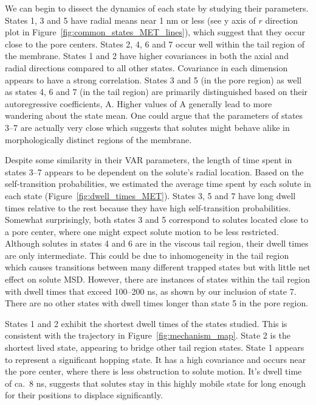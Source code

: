 \documentclass[journal=jpcbfk,manuscript=article]{achemso}
\begin{document}
  We can begin to dissect the dynamics of each state by studying their parameters.
  States 1, 3 and 5 have radial means near 1 nm or less (see y axis of $r$ direction 
  plot in Figure~\ref{fig:common_states_MET_lines}), which suggest that they occur
  close to the pore centers. States 2, 4, 6 and 7 occur well within the tail region
  of the membrane. States 1 and 2 have higher covariances in both the axial and radial
  directions compared to all other states. Covariance in each dimension appears to have
  a strong correlation. States 3 and 5 (in the pore region) as well as states 4, 6 and
  7 (in the tail region) are primarily distinguished based on their autoregressive 
  coefficients, A. Higher values of A generally lead to more wandering about the state
  mean. One could argue that the parameters of states 3--7 are actually very close which
  suggests that solutes might behave alike in 
  morphologically
  distinct regions of the 
  membrane.

  Despite some similarity in their VAR parameters, the length of time spent in states 
  3--7 appears to be dependent on the solute's radial location. Based on the 
  self-transition probabilities, we estimated the average time spent by each solute in
  each state (Figure~\ref{fig:dwell_times_MET}). States 3, 5 and 7 have long dwell times
  relative to the rest because they have high self-transition probabilities. Somewhat 
  surprisingly, both states 3 and 5 correspond to solutes located close to a pore center,
  where one might expect solute motion to be less restricted. 
  Although solutes in states
  4 and 6 are in the viscous tail region, their dwell times are only intermediate. This
  could be due to inhomogeneity in the tail region which causes transitions between many
  different trapped states but with little net effect on solute MSD. However, there are
  instances of states within the tail region with dwell times that exceed 100--200 ns,
  as shown by our inclusion of state 7. There are no other states with dwell times longer
  than state 5 in the pore region.
  
  States 1 and 2 exhibit the shortest dwell times of the states studied. This is 
  consistent with the trajectory in Figure~\ref{fig:mechanism_map}. State 2 is the 
  shortest lived state, appearing to bridge other tail region states. State 1 
  appears to represent a significant hopping state. It has a high covariance and
  occurs near the pore center, where there is less obstruction to solute motion.
  It's dwell time of ca.~8 ns, suggests that solutes stay in this highly mobile 
  state for long enough for their positions to displace significantly.
  
\end{document}
